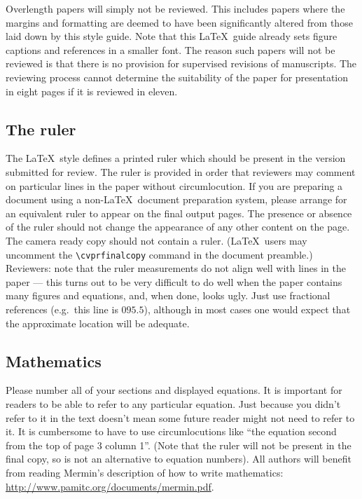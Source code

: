 \documentclass[10pt,twocolumn,letterpaper]{article}
\begin{document}
Overlength papers will simply not be reviewed.  This includes papers
where the margins and formatting are deemed to have been significantly
altered from those laid down by this style guide.  Note that this
\LaTeX\ guide already sets figure captions and references in a smaller font.
The reason such papers will not be reviewed is that there is no provision for
supervised revisions of manuscripts.  The reviewing process cannot determine
the suitability of the paper for presentation in eight pages if it is
reviewed in eleven.  

\subsection{The ruler}
The \LaTeX\ style defines a printed ruler which should be present in the
version submitted for review.  The ruler is provided in order that
reviewers may comment on particular lines in the paper without
circumlocution.  If you are preparing a document using a non-\LaTeX\
document preparation system, please arrange for an equivalent ruler to
appear on the final output pages.  The presence or absence of the ruler
should not change the appearance of any other content on the page.  The
camera ready copy should not contain a ruler. (\LaTeX\ users may uncomment
the \verb'\cvprfinalcopy' command in the document preamble.)  Reviewers:
note that the ruler measurements do not align well with lines in the paper
--- this turns out to be very difficult to do well when the paper contains
many figures and equations, and, when done, looks ugly.  Just use fractional
references (e.g.\ this line is $095.5$), although in most cases one would
expect that the approximate location will be adequate.

\subsection{Mathematics}

Please number all of your sections and displayed equations.  It is
important for readers to be able to refer to any particular equation.  Just
because you didn't refer to it in the text doesn't mean some future reader
might not need to refer to it.  It is cumbersome to have to use
circumlocutions like ``the equation second from the top of page 3 column
1''.  (Note that the ruler will not be present in the final copy, so is not
an alternative to equation numbers).  All authors will benefit from reading
Mermin's description of how to write mathematics:
\url{http://www.pamitc.org/documents/mermin.pdf}.
\end{document}
